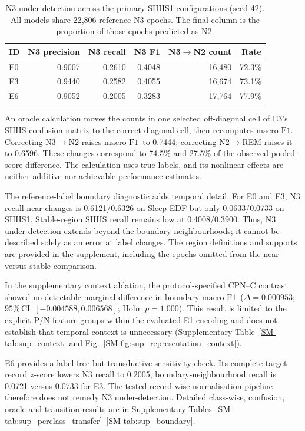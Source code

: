 \documentclass[11pt,a4paper]{article}
\newcommand{\mf}{\ensuremath{\mathrm{macro\text{-}F1}}}
\newcommand{\ci}{\ensuremath{95\%\,\mathrm{CI}}}
\begin{document}
\begin{table}[H]
\centering\small
\caption{N3 under-detection across the primary SHHS1 configurations (seed 42). All models share
22{,}806 reference N3 epochs. The final column is the proportion of those epochs predicted as N2.}
\label{tab:cross-model-n3}
\begin{tabular}{lrrrrr}
\toprule
\textbf{ID} & \textbf{N3 precision} & \textbf{N3 recall} & \textbf{N3 F1} & \textbf{N3$\to$N2 count} & \textbf{Rate} \\
\midrule
E0 & 0.9007 & 0.2610 & 0.4048 & 16{,}480 & 72.3\% \\
E3 & 0.9440 & 0.2582 & 0.4055 & 16{,}674 & 73.1\% \\
E6 & 0.9052 & 0.2005 & 0.3283 & 17{,}764 & 77.9\% \\
\bottomrule
\end{tabular}
\end{table}

An oracle calculation moves the counts in one selected off-diagonal cell of E3's SHHS confusion
matrix to the correct diagonal cell, then recomputes \mf. Correcting N3$\rightarrow$N2 raises \mf\
to 0.7444; correcting N2$\rightarrow$REM raises it to 0.6596. These changes correspond to 74.5\% and
27.5\% of the observed pooled-score difference. The calculation uses true labels, and its nonlinear
effects are neither additive nor achievable-performance estimates.

The reference-label boundary diagnostic adds temporal detail. For E0 and E3, N3 recall near changes
is 0.6121/0.6326 on Sleep-EDF but only 0.0633/0.0733 on SHHS1. Stable-region SHHS recall remains low
at 0.4008/0.3900. Thus, N3 under-detection extends beyond the boundary neighbourhoods; it cannot be
described solely as an error at label changes. The region definitions and supports are provided in
the supplement, including the epochs omitted from the near-versus-stable comparison.

In the supplementary context ablation, the protocol-specified CPN--C contrast showed no detectable
marginal difference in boundary \mf\ ($\Delta=0.000953$; \ci\ $[-0.004588,0.006568]$; Holm
$p=1.000$). This result is limited to the explicit P/N feature groups within the evaluated E1 encoding
and does not establish that temporal context is unnecessary (Supplementary
Table~\ref{SM-tab:sup_context} and Fig.~\ref{SM-fig:sup_representation_context}).

E6 provides a label-free but transductive sensitivity check. Its complete-target-record $z$-score lowers
N3 recall to 0.2005; boundary-neighbourhood recall is 0.0721 versus 0.0733 for E3.
The tested record-wise normalisation pipeline therefore does not remedy N3 under-detection. Detailed
class-wise, confusion, oracle and transition results are in Supplementary
Tables~\ref{SM-tab:sup_perclass_transfer}--\ref{SM-tab:sup_boundary}.
\end{document}
